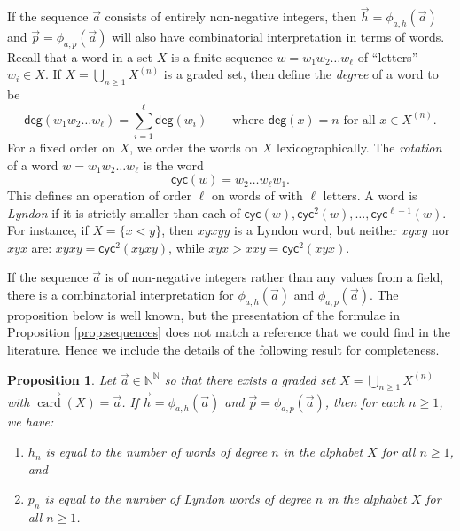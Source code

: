 \documentclass[11pt]{amsart}
\newtheorem{proposition}[theorem]{Proposition}
\theoremstyle{definition}
\numberwithin{equation}{section}
\def\NN{{\mathbb N}}
\def\CC{{\mathbb C}}
\newcommand{\veccard}{\overrightarrow{\operatorname{card}}}
\begin{document}
If the sequence $\vec{a}$ consists of entirely non-negative integers,
then $\vec{h} = \phi_{a, h}(\vec{a})$ and $\vec{p} = \phi_{a, p}(\vec{a})$ will also have combinatorial interpretation in terms of words.
Recall that a word in a set $X$ is a finite sequence $w = w_{1} w_{2} \ldots w_{\ell}$ of ``letters'' $w_{i} \in X$.  
If $X = \bigcup_{n \geq 1} X^{(n)}$ is a graded set, then define the \emph{degree} of a word to be
\[
\mathsf{deg}(w_1 w_2 \ldots w_{\ell}) = \sum_{i = 1}^{\ell} \mathsf{deg}(w_{i})
\qquad\text{where $\mathsf{deg}(x) = n$ for all $x \in X^{(n)}$}.
\]
For a fixed order on $X$, we order the words on $X$ lexicographically.  
The \emph{rotation} of a word $w = w_{1} w_{2} \ldots w_{\ell}$ is the word
\[
\mathsf{cyc}(w) =  w_{2} \ldots w_{\ell} w_{1}.
\]
This defines an operation of order $\ell$ on words of with $\ell$ letters.  
A word is \emph{Lyndon} if it is strictly smaller than each of $\mathsf{cyc}(w), \mathsf{cyc}^{2}(w), \ldots, \mathsf{cyc}^{\ell-1}(w)$.  
For instance, if $X = \{x < y\}$, then $xyxyy$ is a Lyndon word, but neither $xyxy$ nor $xyx$ are: $xyxy = \mathsf{cyc}^{2}(xyxy)$, while $xyx > xxy = \mathsf{cyc}^{2}(xyx)$.

If the sequence $\vec{a}$ is of non-negative integers rather than
any values from a field, there is a combinatorial interpretation for
$\phi_{a, h}(\vec{a})$ and $\phi_{a, p}(\vec{a})$.
The proposition below is well known, but the presentation of the
formulae in Proposition \ref{prop:sequences} does not match a reference that
we could find in the literature.  Hence we include the details of the
following result for completeness.

\begin{proposition}
\label{prop:combinatorialinterpretation}
Let $\vec{a} \in \NN^{\NN}$ so that there exists a graded set $X = \bigcup_{n \geq 1} X^{(n)}$ with $\veccard(X) = \vec{a}$.  
If $\vec{h} = \phi_{a, h}(\vec{a})$ and $\vec{p} = \phi_{a, p}(\vec{a})$, then for each $n \geq 1$, we have:
\begin{enumerate}[itemsep = 0.5em]
\item $h_n$ is equal to the number of words of degree $n$ in the alphabet $X$ for all $n \ge 1$, and 

\item $p_n$ is equal to the number of Lyndon words of degree $n$ in the alphabet $X$ for all $n \ge 1$.
\end{enumerate}
\end{proposition}
\end{document}
